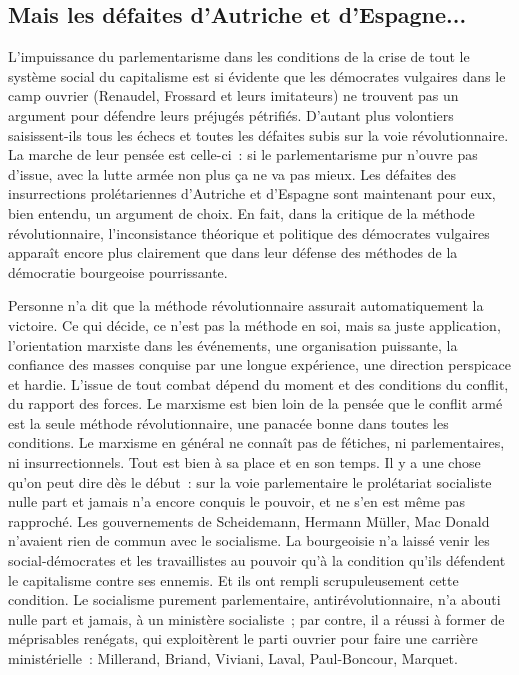 \documentclass[french,twoside]{book} %
\begin{document}
\subsection[{Mais les défaites d’Autriche et d’Espagne...}]{Mais les défaites d’Autriche et d’Espagne...}
\noindent L’impuissance du parlementarisme dans les conditions de la crise de tout le système social du capitalisme est si évidente que les démocrates vulgaires dans le camp ouvrier (Renaudel, Frossard et leurs imitateurs) ne trouvent  pas un argument pour défendre leurs préjugés pétrifiés. D’autant plus volontiers saisissent-ils tous les échecs et toutes les défaites subis sur la voie révolutionnaire. La marche de leur pensée est celle-ci : si le parlementarisme pur n’ouvre pas d’issue, avec la lutte armée non plus ça ne va pas mieux. Les défaites des insurrections prolétariennes d’Autriche et d’Espagne sont maintenant pour eux, bien entendu, un argument de choix. En fait, dans la critique de la méthode révolutionnaire, l’inconsistance théorique et politique des démocrates vulgaires apparaît encore plus clairement que dans leur défense des méthodes de la démocratie bourgeoise pourrissante.\par
Personne n’a dit que la méthode révolutionnaire assurait automatiquement la victoire. Ce qui décide, ce n’est pas la méthode en soi, mais sa juste application, l’orientation marxiste dans les événements, une organisation puissante, la confiance des masses conquise par une longue expérience, une direction perspicace et hardie. L’issue de tout combat dépend du moment et des conditions du conflit, du rapport des forces. Le marxisme est bien loin de la pensée que le conflit armé est la seule méthode révolutionnaire, une panacée bonne dans toutes les conditions. Le marxisme en général ne connaît pas de fétiches, ni parlementaires, ni insurrectionnels. Tout est bien à sa place et en son temps. Il y a une chose qu’on peut dire dès le début : sur la voie parlementaire le prolétariat socialiste nulle part et jamais n’a encore conquis le pouvoir, et ne s’en est même pas rapproché. Les gouvernements de Scheidemann, Hermann Müller, Mac Donald n’avaient rien de commun avec le socialisme. La bourgeoisie n’a laissé venir les social-démocrates et les travaillistes au pouvoir qu’à la condition qu’ils défendent le capitalisme contre ses ennemis. Et ils ont rempli scrupuleusement cette condition. Le socialisme purement parlementaire, antirévolutionnaire, n’a abouti nulle part et  jamais, à un ministère socialiste ; par contre, il a réussi à former de méprisables renégats, qui exploitèrent le parti ouvrier pour faire une carrière ministérielle : Millerand, Briand, Viviani, Laval, Paul-Boncour, Marquet.\par
\end{document}
